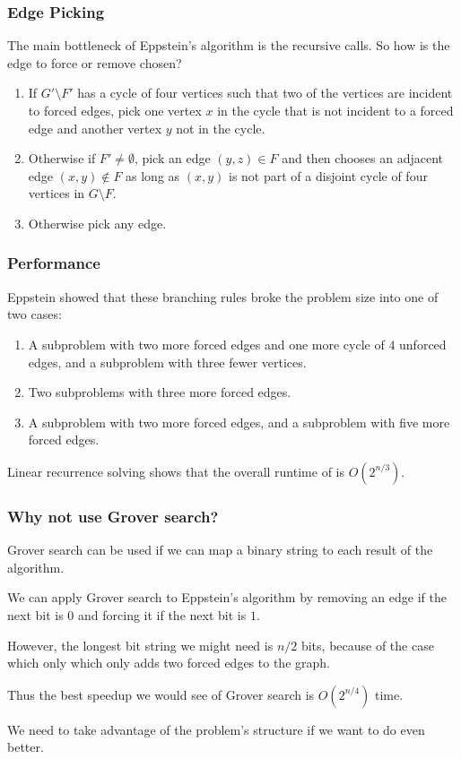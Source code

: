 \documentclass[aspectratio=169]{beamer}
\begin{document}
\begin{frame}
\frametitle{Edge Picking}
The main bottleneck of Eppstein's algorithm is the recursive calls. So how is the edge to force or remove chosen?

\begin{enumerate}
\item If $G' \setminus F'$ has a cycle of four vertices such that two of the vertices are incident to forced edges, pick one vertex $x$ in the cycle that is not incident to a forced edge and another vertex $y$ not in the cycle.
\item Otherwise if $F' \neq \emptyset$, pick an edge $(y, z) \in F$ and then chooses an adjacent edge $(x, y) \notin F$ as long as $(x, y)$ is not part of a disjoint cycle of four vertices in $G \setminus F$.
\item Otherwise pick any edge.
\end{enumerate}

\end{frame}

\begin{frame}
\frametitle{Performance}
Eppstein showed that these branching rules broke the problem size into one of two cases:

\begin{enumerate}
\item A subproblem with two more forced edges and one more cycle of $4$ unforced edges, and a subproblem with three fewer vertices.
\item Two subproblems with three more forced edges.
\item A subproblem with two more forced edges, and a subproblem with five more forced edges.
\end{enumerate}

Linear recurrence solving shows that the overall runtime of is $O(2^{n/3})$.
\end{frame}

\begin{frame}
\frametitle{Why not use Grover search?}
Grover search can be used if we can map a binary string to each result of the algorithm.

We can apply Grover search to Eppstein's algorithm by removing an edge if the next bit is $0$ and forcing it if the next bit is $1$.

However, the longest bit string we might need is $n/2$ bits, because of the case which only which only adds two forced edges to the graph.

Thus the best speedup we would see of Grover search is $O(2^{n/4})$ time.

We need to take advantage of the problem's structure if we want to do even better.
\end{frame}
\end{document}
